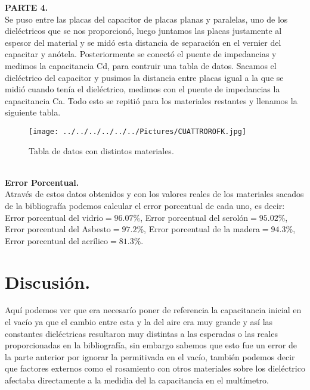 \documentclass[11pt,a4paper]{article}
\begin{document}
\textbf{PARTE 4.}
\\
Se puso entre las placas del capacitor de placas planas y paralelas, uno de los diel\'{e}ctricos que se nos proporcion\'{o}, luego juntamos las placas justamente al espesor del material y se mid\'{o} esta distancia de separaci\'{o}n en el vernier del capacitar y an\'{o}tela. Posteriormente se conect\'{o} el puente de impedancias y medimos la capacitancia Cd, para contruir una tabla de datos. Sacamos el diel\'{e}ctrico del capacitor y pusimos la distancia entre placas igual a la que se midi\'{o} cuando ten\'{i}a el diel\'{e}ctrico, medimos con el puente de impedancias la capacitancia Ca. Todo esto se repiti\'{o} para los materiales restantes y llenamos la siguiente tabla.
\begin{figure}[hbtp]
\caption{Tabla de datos con distintos materiales. }
\centering
\texttt{[image: ../../../../../../Pictures/CUATTROROFK.jpg]}
\end{figure}
\\
\textbf{Error Porcentual.}\\
Atrav\'{e}s de estos datos obtenidos y con los valores reales de los materiales sacados de la bibliograf\'{i}a podemos calcular el error porcentual de cada uno, es decir:\\
Error porcentual del vidrio$= 96.07 \%$, Error porcentual del serol\'{o}n$= 95.02\%$, Error porcentual del Asbesto$= 97.2\%$, Error porcentual de la madera$=94.3 \%$, Error porcentual del acr\'{i}lico$=81.3 \%$.

\section*{Discusi\'{o}n.}
Aqu\'{i} podemos ver que era necesar\'{i}o poner de referencia la capacitancia inicial en el vac\'{i}o ya que el cambio entre esta y la del aire era muy grande y as\'{i} las constantes diel\'{e}ctricas resultaron muy distintas a las esperadas o las reales proporcionadas en la bibliograf\'{i}a, sin embargo sabemos que esto fue un error de la parte anterior por ignorar la permitivada en el vac\'{i}o, tambi\'{e}n podemos decir que factores externos como el rosamiento con otros materiales sobre los diel\'{e}ctrico afectaba directamente a la medidia del la capacitancia en el mult\'{i}metro. 

\end{document}
